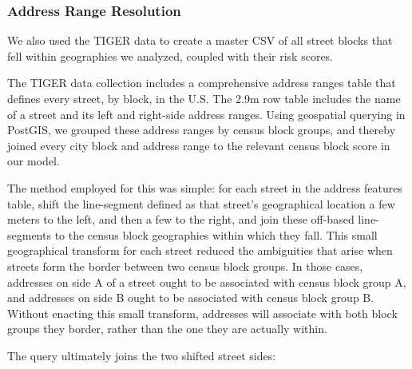 \documentclass{sig-alternate}
\begin{document}
\subsubsection{Address Range Resolution}

We also used the TIGER data to create a master CSV of all street blocks that fell within geographies we analyzed, coupled with their risk scores.

The TIGER data collection includes a comprehensive address ranges table that defines every street, by block, in the U.S. The 2.9m row table includes the name of a street and its left and right-side address ranges. Using geospatial querying in PostGIS, we grouped these address ranges by census block groups, and thereby joined every city block and address range to the relevant census block score in our model. 

The method employed for this was simple: for each street in the address features table, shift the line-segment defined as that street's geographical location a few meters to the left, and then a few to the right, and join these off-based line-segments to the census block geographies within which they fall. This small geographical transform for each street reduced the ambiguities that arise when streets form the border between two census block groups. In those cases, addresses on side A of a street ought to be associated with census block group A, and addresses on side B ought to be associated with census block group B. Without enacting this small transform, addresses will associate with both block groups they border, rather than the one they are actually within.

The query ultimately joins the two shifted street sides:
\end{document}
